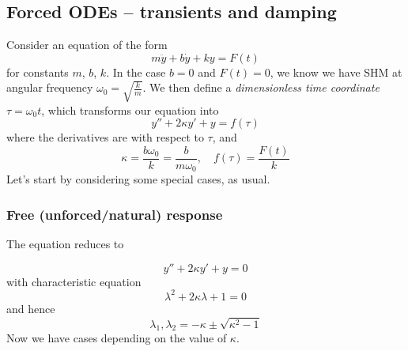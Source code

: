 \documentclass{../../template/note}
\begin{document}
    \subsection{Forced ODEs -- transients and damping}

    Consider an equation of the form
    \[
        m \ddot y + b \dot y + ky = F(t)
    \]
    for constants \(m\), \(b\), \(k\). In the case \(b = 0\) and \(F(t) = 0\), we know we have SHM at angular frequency \(\omega_0 = \sqrt{\frac{k}{m}}\). We then define a \emph{dimensionless time coordinate} \(\tau = \omega_0 t\), which transforms our equation into
    \[
        y'' + 2 \kappa y' + y = f(\tau)
    \]
    where the derivatives are with respect to \(\tau\), and
    \[
        \kappa = \frac{b\omega_0}{k} = \frac{b}{m\omega_0}, \quad f(\tau) = \frac{F(t)}{k}
    \]
    Let's start by considering some special cases, as usual.
    
    \subsubsection{Free (unforced/natural) response}

    The equation reduces to

    \[
        y'' + 2\kappa y' + y = 0
    \]
    with characteristic equation
    \[
        \lambda^2 + 2 \kappa \lambda + 1 = 0
    \]
    and hence
    \[
        \lambda_1, \lambda_2 = -\kappa \pm \sqrt{\kappa^2-1}
    \]
    Now we have cases depending on the value of \(\kappa\).
\end{document}
